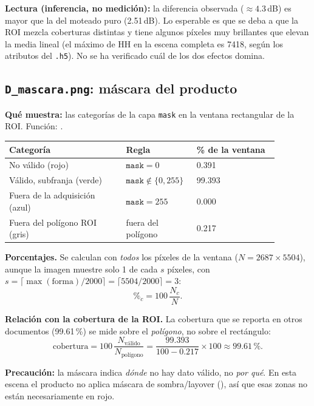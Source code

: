 \documentclass[11pt,a4paper]{article}
\begin{document}
\textbf{Lectura (inferencia, no medición):} la diferencia observada ($\approx 4.3$\,dB) es mayor que la del moteado puro (2.51\,dB).
Lo esperable es que se deba a que la ROI mezcla coberturas distintas y tiene algunos píxeles muy brillantes que elevan la media lineal
(el máximo de HH en la escena completa es 7418, según los atributos del \texttt{.h5}). No se ha verificado cuál de los dos efectos
domina.

\subsection{\texttt{D\_mascara.png}: máscara del producto}

\textbf{Qué muestra:} las categorías de la capa \texttt{mask} en la ventana rectangular de la ROI. Función: .

\begin{longtable}{p{0.40\linewidth}p{0.20\linewidth}p{0.28\linewidth}}
\toprule
\textbf{Categoría} & \textbf{Regla} & \textbf{\% de la ventana} \\
\midrule
No válido (rojo) & $\texttt{mask} = 0$ & 0.391 \\
Válido, subfranja (verde) & $\texttt{mask} \notin \{0,255\}$ & 99.393 \\
Fuera de la adquisición (azul) & $\texttt{mask} = 255$ & 0.000 \\
Fuera del polígono ROI (gris) & fuera del polígono & 0.217 \\
\bottomrule
\end{longtable}

\textbf{Porcentajes.} Se calculan con \emph{todos} los píxeles de la ventana ($N = 2687 \times 5504$), aunque la imagen muestre solo 1
de cada $s$ píxeles, con $s = \lceil \max(\text{forma}) / 2000 \rceil = \lceil 5504/2000 \rceil = 3$:
\begin{equation}
  \%_c = 100\,\frac{N_c}{N}.
\end{equation}

\textbf{Relación con la cobertura de la ROI.} La cobertura que se reporta en otros documentos (99.61\,\%) se mide sobre el
\emph{polígono}, no sobre el rectángulo:
\begin{equation}
  \text{cobertura} = 100\,\frac{N_{\text{válido}}}{N_{\text{polígono}}}
  = \frac{99.393}{100 - 0.217}\times 100 \approx 99.61\,\%.
\end{equation}

\textbf{Precaución:} la máscara indica \emph{dónde} no hay dato válido, no \emph{por qué}. En esta escena el producto no aplica
máscara de sombra/layover (), así que esas zonas no están necesariamente en rojo.
\end{document}
